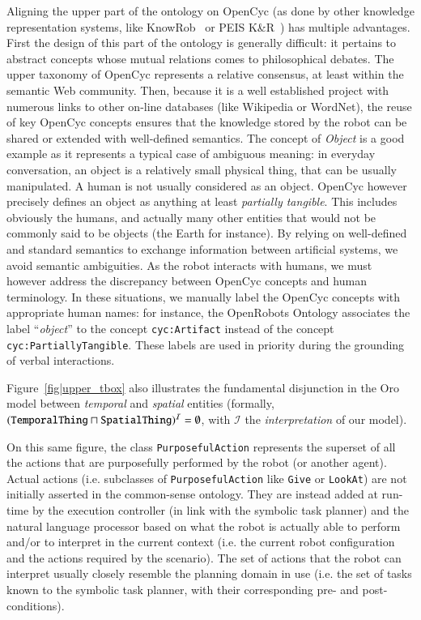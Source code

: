 \documentclass[preprint,3p,times]{elsarticle}
\newcommand{\concept}[1]{{\small \texttt{#1}}}
\newcommand{\ie}{i.e.\xspace}
\begin{document}
Aligning the upper part of the ontology on {\sc OpenCyc} (as done by other
knowledge representation systems, like {\sc KnowRob}~\cite{Tenorth2009a} or PEIS
K\&R~\cite{daoutis2012cooperative}) has multiple advantages. First the design of
this part of the ontology is generally difficult: it pertains to abstract
concepts whose mutual relations comes to philosophical debates. The upper
taxonomy of {\sc OpenCyc} represents a relative consensus, at least within the
semantic Web community. Then, because it is a well established project with
numerous links to other on-line databases (like Wikipedia or WordNet), the reuse
of key {\sc OpenCyc} concepts ensures that the knowledge stored by the robot can
be shared or extended with well-defined semantics. The concept of \emph{Object}
is a good example as it represents a typical case of ambiguous meaning: in everyday conversation, an
object is a relatively small physical thing, that can be usually manipulated.
A human is not usually considered as an object. {\sc OpenCyc} however precisely
defines an object as anything at least \emph{partially tangible}. This includes
obviously the humans, and actually many other entities that would not be
commonly said to be objects (the Earth for instance).
By relying on well-defined and standard semantics to
exchange information between artificial systems, we avoid semantic ambiguities.
As the robot interacts with humans, we must however address the discrepancy
between {\sc OpenCyc} concepts and human terminology. In these situations, we
manually label the {\sc OpenCyc} concepts with appropriate human names: for
instance, the OpenRobots Ontology associates the label ``\emph{object}'' to the
concept \concept{cyc:Artifact} instead of the concept
\concept{cyc:PartiallyTangible}.  These labels are used in priority during the
grounding of verbal interactions.

Figure~\ref{fig|upper_tbox} also illustrates the fundamental disjunction
in the {\sc Oro} model between \emph{temporal} and \emph{spatial} entities (formally,
$(\text{\tt TemporalThing} \sqcap \text{\tt SpatialThing})^{\mathcal{I}} = \emptyset$, with
$\mathcal{I}$ the \emph{interpretation} of our model).

On this same figure, the class \concept{PurposefulAction} represents the superset of all the actions that are
purposefully performed by the robot (or another agent). Actual actions (\ie
subclasses of \concept{PurposefulAction} like \concept{Give} or
\concept{LookAt}) are not initially asserted in the common-sense ontology. They
are instead added at run-time by the execution controller (in link with the
symbolic task planner) and the natural language processor based on what the
robot is actually able to perform and/or to interpret in the current context
(\ie the current robot configuration and the actions required by the scenario).
The set of actions that the robot can interpret usually closely resemble the
planning domain in use (\ie the set of tasks known to the symbolic task planner,
with their corresponding pre- and post-conditions).
\end{document}
